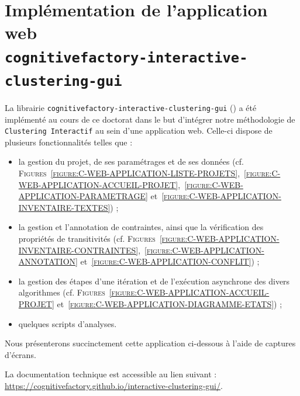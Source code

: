 \section{Implémentation de l'application web \\ \texttt{cognitivefactory-interactive-clustering-gui}}
\label{annex:C.3-DESCRIPTION-IMPLEMENTATION-INTERACTIVE-CLUSTERING-GUI}

	La librairie \texttt{cognitivefactory-interactive-clustering-gui} (\cite{schild-etal:2022:cognitivefactory-interactiveclusteringgui}) a été implémenté au cours de ce doctorat dans le but d'intégrer notre méthodologie de \texttt{Clustering Interactif} au sein d'une application web.
	Celle-ci dispose de plusieurs fonctionnalités telles que :
	\begin{itemize}
		\item la gestion du projet, de ses paramétrages et de ses données (cf. \textsc{Figures}~\textsc{\ref{figure:C-WEB-APPLICATION-LISTE-PROJETS}},~\textsc{\ref{figure:C-WEB-APPLICATION-ACCUEIL-PROJET}},~\textsc{\ref{figure:C-WEB-APPLICATION-PARAMETRAGE}} et~\textsc{\ref{figure:C-WEB-APPLICATION-INVENTAIRE-TEXTES}}) ;
		\item la gestion et l'annotation de contraintes, ainsi que la vérification des propriétés de transitivités (cf. \textsc{Figures}~\textsc{\ref{figure:C-WEB-APPLICATION-INVENTAIRE-CONTRAINTES}},~\textsc{\ref{figure:C-WEB-APPLICATION-ANNOTATION}} et~\textsc{\ref{figure:C-WEB-APPLICATION-CONFLIT}}) ;
		\item la gestion des étapes d'une itération et de l'exécution asynchrone des divers algorithmes (cf. \textsc{Figures}~\textsc{\ref{figure:C-WEB-APPLICATION-ACCUEIL-PROJET}} et~\textsc{\ref{figure:C-WEB-APPLICATION-DIAGRAMME-ETATS}}) ;
		\item quelques scripts d'analyses.
	\end{itemize}
	
	Nous présenterons succinctement cette application ci-dessous à l'aide de captures d'écrans.
	
	\begin{leftBarInformation}
		La documentation technique est accessible au lien suivant : \url{https://cognitivefactory.github.io/interactive-clustering-gui/}.
	\end{leftBarInformation}
	

